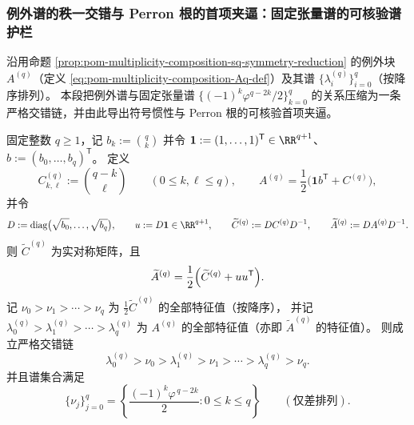 \subsubsection{例外谱的秩一交错与 Perron 根的首项夹逼：固定张量谱的可核验谱护栏}
沿用命题 \ref{prop:pom-multiplicity-composition-sq-symmetry-reduction} 的例外块 \(A^{(q)}\)（定义 \eqref{eq:pom-multiplicity-composition-Aq-def}）及其谱
\(\{\lambda_i^{(q)}\}_{i=0}^{q}\)（按降序排列）。
本段把例外谱与固定张量谱 \(\{(-1)^k\varphi^{q-2k}/2\}_{k=0}^{q}\) 的关系压缩为一条严格交错链，并由此导出符号惯性与 Perron 根的可核验首项夹逼。

\begin{theorem}\label{thm:xi-replica-softcore-exceptional-interlacing}
固定整数 \(q\ge 1\)，记 \(b_k:=\binom{q}{k}\) 并令 \(\mathbf{1}:=(1,\dots,1)^{\mathsf T}\in\RR^{q+1}\)、\(b:=(b_0,\dots,b_q)^{\mathsf T}\)。
定义
\[
C^{(q)}_{k,\ell}:=\binom{q-k}{\ell}\qquad(0\le k,\ell\le q),
\qquad
A^{(q)}=\frac12\bigl(\mathbf{1}b^{\mathsf T}+C^{(q)}\bigr),
\]
并令
\[
D:=\mathrm{diag}\bigl(\sqrt{b_0},\dots,\sqrt{b_q}\bigr),\qquad
u:=D\mathbf{1}\in\RR^{q+1},
\qquad
\widetilde C^{(q)}:=D C^{(q)}D^{-1},\qquad
\widetilde A^{(q)}:=D A^{(q)}D^{-1}.
\]
则 \(\widetilde C^{(q)}\) 为实对称矩阵，且
\[
\widetilde A^{(q)}=\frac12\Bigl(\widetilde C^{(q)}+uu^{\mathsf T}\Bigr).
\]
记 \(\nu_0>\nu_1>\cdots>\nu_q\) 为 \(\frac12\widetilde C^{(q)}\) 的全部特征值（按降序），
并记 \(\lambda_0^{(q)}>\lambda_1^{(q)}>\cdots>\lambda_q^{(q)}\) 为 \(A^{(q)}\) 的全部特征值（亦即 \(\widetilde A^{(q)}\) 的特征值）。
则成立严格交错链
\[
\lambda_0^{(q)}>\nu_0>\lambda_1^{(q)}>\nu_1>\cdots>\lambda_q^{(q)}>\nu_q.
\]
并且谱集合满足
\[
\{\nu_j\}_{j=0}^{q}=\left\{\frac{(-1)^k\varphi^{\,q-2k}}{2}:0\le k\le q\right\}
\qquad(\text{仅差排列}).
\]
\end{theorem}
